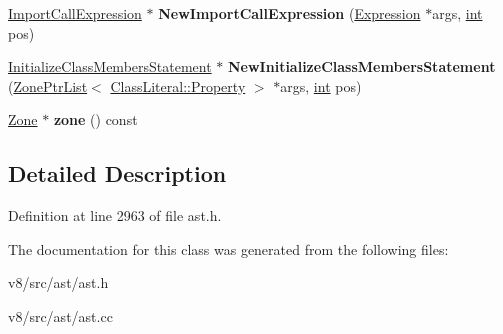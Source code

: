 \begin{DoxyCompactItemize}
\mbox{\hyperlink{classv8_1_1internal_1_1ImportCallExpression}{Import\+Call\+Expression}} $\ast$ {\bfseries New\+Import\+Call\+Expression} (\mbox{\hyperlink{classv8_1_1internal_1_1Expression}{Expression}} $\ast$args, \mbox{\hyperlink{classint}{int}} pos)
\item 
\mbox{\label{classv8_1_1internal_1_1AstNodeFactory_a0af64794836cee830dfe2a7cc963fb31}} 
\mbox{\hyperlink{classv8_1_1internal_1_1InitializeClassMembersStatement}{Initialize\+Class\+Members\+Statement}} $\ast$ {\bfseries New\+Initialize\+Class\+Members\+Statement} (\mbox{\hyperlink{classv8_1_1internal_1_1ZoneList}{Zone\+Ptr\+List}}$<$ \mbox{\hyperlink{classv8_1_1internal_1_1ClassLiteralProperty}{Class\+Literal\+::\+Property}} $>$ $\ast$args, \mbox{\hyperlink{classint}{int}} pos)
\item 
\mbox{\label{classv8_1_1internal_1_1AstNodeFactory_a04c403103080f2aa3cf0da4049c7c877}} 
\mbox{\hyperlink{classv8_1_1internal_1_1Zone}{Zone}} $\ast$ {\bfseries zone} () const
\end{DoxyCompactItemize}


\subsection{Detailed Description}


Definition at line 2963 of file ast.\+h.



The documentation for this class was generated from the following files\+:\begin{DoxyCompactItemize}
\item 
v8/src/ast/ast.\+h\item 
v8/src/ast/ast.\+cc\end{DoxyCompactItemize}
